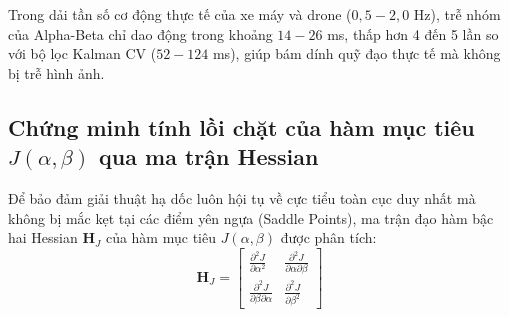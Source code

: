 \begin{table}[H]
\centering
\caption{Đo đạc trễ nhóm $\tau_g$ theo dải tần số dao động cơ động của mục tiêu ($T_s = 100$ ms)}
\label{tab:group-delay-spectrum-table}
\end{table}

Trong dải tần số cơ động thực tế của xe máy và drone ($0{,}5 - 2{,}0$ Hz), trễ nhóm của Alpha-Beta chỉ dao động trong khoảng $14 - 26$ ms, thấp hơn 4 đến 5 lần so với bộ lọc Kalman CV ($52 - 124$ ms), giúp bám dính quỹ đạo thực tế mà không bị trễ hình ảnh.

\subsection{Chứng minh tính lồi chặt của hàm mục tiêu \texorpdfstring{$J(\alpha, \beta)$}{J(alpha, beta)} qua ma trận Hessian}

\hspace{0.5cm} Để bảo đảm giải thuật hạ dốc luôn hội tụ về cực tiểu toàn cục duy nhất mà không bị mắc kẹt tại các điểm yên ngựa (Saddle Points), ma trận đạo hàm bậc hai Hessian $\mathbf{H}_J$ của hàm mục tiêu $J(\alpha, \beta)$ được phân tích:
\begin{equation}
\mathbf{H}_J = \begin{bmatrix}
\frac{\partial^2 J}{\partial \alpha^2} & \frac{\partial^2 J}{\partial \alpha \partial \beta} \\
\frac{\partial^2 J}{\partial \beta \partial \alpha} & \frac{\partial^2 J}{\partial \beta^2}
\end{bmatrix}
\label{eq:hessian-matrix-formula}
\end{equation}

